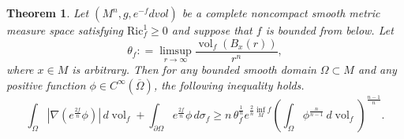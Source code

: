 \documentclass[psamsfonts]{amsart}
\newtheorem{thm}{Theorem}[section]
\theoremstyle{definition}
\theoremstyle{remark}
\numberwithin{equation}{section}
\begin{document}
\begin{thm} \label{thm:Sobolev-inequa}
    Let $(M^n, g, e^{-f}dvol)$ be a complete noncompact smooth metric measure space satisfying $\mathrm{Ric}_f^1 \geq 0$ and suppose that $f$ is bounded from below.
 Let
    $$\theta_f: = \limsup_{r \to \infty} \frac{\operatorname{vol}_f(B_x(r))}{r^n},$$
    where $x \in M$ is arbitrary.
    Then for any bounded smooth domain $\Omega \subset M$
    and any positive function $\phi \in C^\infty (\overline{\Omega})$, the following inequality holds.
    \begin{equation}
    \int_\Omega \left|\nabla \left(e^{\frac{2f}{n}}\phi\right)\right|\,d\operatorname{vol}_f +  \int_{\partial \Omega} e^{\frac{2f}{n}}\phi \,d\sigma_f \geq n \,\theta_f^\frac{1}{n} e^{\frac{2}{n}\inf_Mf}\left(\int_\Omega \phi^{\frac{n}{n-1}} \,d\operatorname{vol}_f \right)^{\frac{n-1}{n}}. \label{Sobolev-inequa}
    \end{equation}
\end{thm} 
\end{document}
